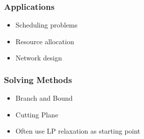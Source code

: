 \documentclass[11pt,a4paper]{article}
\begin{document}
\begin{multicols}{2}
\subsubsection{Applications}
\begin{itemize}
    \item Scheduling problems
    \item Resource allocation
    \item Network design
\end{itemize}

\subsubsection{Solving Methods}
\begin{itemize}
    \item Branch and Bound
    \item Cutting Plane
    \item Often use LP relaxation as starting point
\end{itemize}


\end{multicols}
\end{document}
